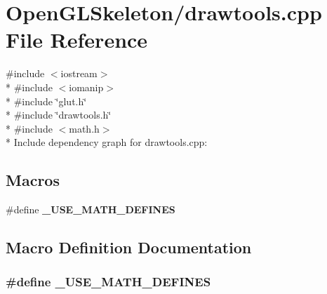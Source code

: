 \section{Open\+G\+L\+Skeleton/drawtools.cpp File Reference}
\label{drawtools_8cpp}
{\ttfamily \#include $<$iostream$>$}\\*
{\ttfamily \#include $<$iomanip$>$}\\*
{\ttfamily \#include \char`\"{}glut.\+h\char`\"{}}\\*
{\ttfamily \#include \char`\"{}drawtools.\+h\char`\"{}}\\*
{\ttfamily \#include $<$math.\+h$>$}\\*
Include dependency graph for drawtools.\+cpp\+:
\subsection*{Macros}
\begin{DoxyCompactItemize}
\item 
\#define {\bf \+\_\+\+U\+S\+E\+\_\+\+M\+A\+T\+H\+\_\+\+D\+E\+F\+I\+N\+ES}
\end{DoxyCompactItemize}


\subsection{Macro Definition Documentation}
\subsubsection[{\+\_\+\+U\+S\+E\+\_\+\+M\+A\+T\+H\+\_\+\+D\+E\+F\+I\+N\+ES}]{\setlength{\rightskip}{0pt plus 5cm}\#define \+\_\+\+U\+S\+E\+\_\+\+M\+A\+T\+H\+\_\+\+D\+E\+F\+I\+N\+ES}\label{drawtools_8cpp_a525335710b53cb064ca56b936120431e}
